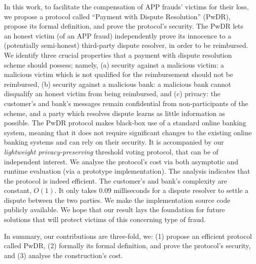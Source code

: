  In this work, to  facilitate  the compensation of   APP frauds' victims  for their loss, we propose   a protocol called ``Payment with Dispute Resolution'' (PwDR), propose its formal definition,  and  prove the protocol's security.  The PwDR lets an honest victim (of an APP fraud)  independently prove its innocence to a  (potentially semi-honest) third-party dispute resolver, in order to be reimbursed.  We identify three crucial properties that a payment with dispute resolution scheme should possess; namely, (a) security against a malicious victim: a malicious victim  which is not qualified for the reimbursement should not be reimbursed, (b) security against a malicious bank: a malicious bank cannot disqualify an honest victim  from being reimbursed, and (c) privacy: the customer’s and bank’s messages remain confidential from non-participants of the scheme, and a party which resolves dispute  learns as little information as possible.  The  PwDR protocol makes black-box use of a standard  online banking system, meaning that it does not require significant changes to the existing online banking systems and can rely on their security. It is accompanied by our \emph{lightweight privacy-preserving} threshold voting protocol, that can be of independent interest. We analyse the protocol's cost via both asymptotic and runtime  evaluation (via a prototype implementation). The analysis indicates that the protocol is indeed efficient. The customer's and bank's  complexity are constant, $O(1)$. It only takes $0.09$ milliseconds for a dispute resolver to settle a dispute between the two parties. We  make  the implementation source code publicly available. We hope that our result lays the foundation for future solutions that will protect victims of this concerning type of  fraud. 

In summary,  our contributions are three-fold, we: (1) propose an efficient protocol called PwDR, (2) formally  its formal definition,  and  prove the protocol's security, and (3)  analyse  the construction's cost.     


  





